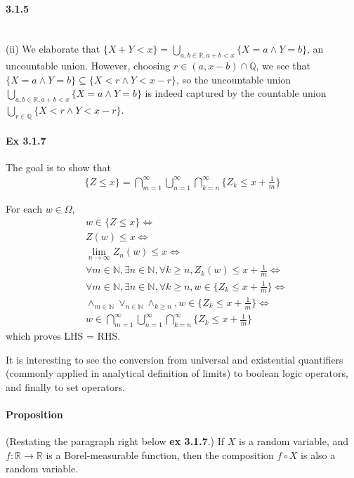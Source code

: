 \documentclass[a4paper]{article}
\newcommand{\real}[0]{\mathbb{R}} %
\newcommand{\rational}[0]{\mathbb{Q}} %
\newcommand{\nat}[0]{\mathbb{N}} %
\newcommand{\limitinf}[1][n]{\lim_{#1\rightarrow \infty}} %
\newcommand{\forallNat}[1][n]{\forall #1\in\nat}
\newcommand{\existsNat}[1][n]{\exists #1\in\nat}
\begin{document}
\paragraph{3.1.5}\mbox{}\\ 
(ii) We elaborate that $\{X+Y < x\} = \bigcup_{a,b\in\real,a+b<x}\{X=a\land Y=b\}$, an uncountable union. However, choosing $r\in (a, x-b)\cap \rational$, we see that $\{X = a\land Y = b\}\subseteq \{X < r\land Y < x-r\}$, so the uncountable union $\bigcup_{a,b\in\real,a+b<x}\{X=a\land Y=b\}$ is indeed captured by the countable union $\bigcup_{r\in\rational}\{X < r\land Y < x-r\}$.

\paragraph{Ex 3.1.7} The goal is to show that
\begin{align*}
	\{Z\leq x\} = \bigcap_{m=1}^\infty\bigcup_{n=1}^\infty\bigcap_{k=n}^\infty \{Z_k\leq x + \frac{1}{m}\}
\end{align*}

For each $w\in \Omega$,
\begin{align*}
	&w\in \{Z\leq x\}\iff \\
	&Z(w) \leq x\iff \\
	&\limitinf Z_n(w) \leq x\iff \\
	&\forallNat[m], \existsNat[n], \forall k\geq n, Z_k(w) \leq  x + \frac{1}{m}\iff \\
	&\forallNat[m], \existsNat[n], \forall k\geq n, w\in \{Z_k \leq  x + \frac{1}{m}\}\iff \\
	&\land_{m\in \nat} \lor_{n\in \nat} \land_{k\geq n}, w\in \{Z_k \leq  x + \frac{1}{m}\}\iff \\
	&w\in \bigcap_{m=1}^\infty\bigcup_{n=1}^\infty\bigcap_{k=n}^\infty \{Z_k\leq x + \frac{1}{m}\}
\end{align*}
which proves LHS = RHS.

It is interesting to see the conversion from universal and existential quantifiers (commonly applied in analytical definition of limits) to boolean logic operators, and finally to set operators.

\paragraph{Proposition} (Restating the paragraph right below \textbf{ex 3.1.7}.) If $X$ is a random variable, and $f: \real\rightarrow\real$ is a Borel-measurable function, then the composition $f\circ X$ is also a random variable.
\end{document}

